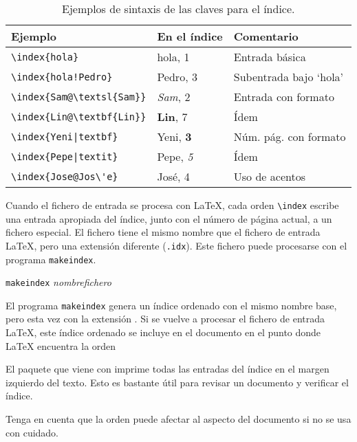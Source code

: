 \begin{table}[!tp]
\caption{Ejemplos de sintaxis de las claves para el índice.}
\label{index}
\begin{center}
\begin{tabular}{@{}lll@{}}
  \textbf{Ejemplo} &\textbf{En el índice} &\textbf{Comentario}\\\hline
  \rule{0pt}{1.05em}\verb|\index{hola}| &hola, 1 &Entrada básica\\ 
\verb|\index{hola!Pedro}|   &\hspace*{2ex}Pedro, 3 &Subentrada bajo `hola'\\ 
\verb|\index{Sam@\textsl{Sam}}|     &\textsl{Sam}, 2& Entrada con formato\\ 
\verb|\index{Lin@\textbf{Lin}}|     &\textbf{Lin}, 7& Ídem\\ 
\verb.\index{Yeni|textbf}.     &Yeni, \textbf{3}& Núm. pág. con formato\\
\verb.\index{Pepe|textit}.     &Pepe, \textit{5}& Ídem\\
\verb.\index{Jose@Jos\'e}.     &Jos\'e, 4& Uso de acentos
\end{tabular}
\end{center}
\end{table}

Cuando el fichero de entrada se procesa con \LaTeX{}, cada orden
\verb|\index| escribe una entrada apropiada del índice, junto con el
número de página actual, a un fichero especial.  El fichero tiene el
mismo nombre que el fichero de entrada \LaTeX{}, pero una extensión
diferente (\verb|.idx|).  Este fichero  puede procesarse con
el programa \texttt{makeindex}.

\begin{lscommand}
  \texttt{makeindex} \emph{nombrefichero}
\end{lscommand}
El programa \texttt{makeindex} genera un índice ordenado con el mismo
nombre base, pero esta vez con la extensión .  Si se vuelve
a procesar el fichero de entrada \LaTeX{}, este índice ordenado se
incluye en el documento en el punto donde  \LaTeX{} encuentra la orden
\begin{lscommand}
\end{lscommand}

El paquete  que viene con \LaTeXe{} imprime todas las
entradas del índice en el margen izquierdo del texto.  Esto es
bastante útil para revisar un documento y verificar el índice.

Tenga en cuenta que la orden  puede afectar al aspecto del
documento si no se usa con cuidado.

